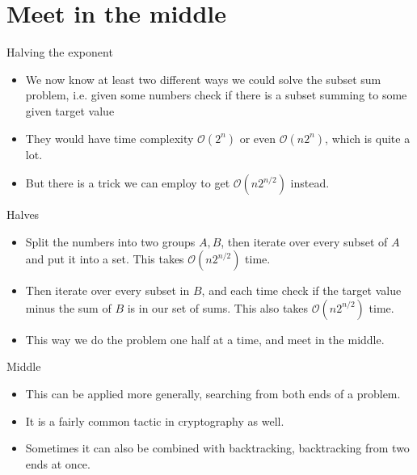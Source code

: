 \documentclass{beamer}
\begin{document}
\section*{Meet in the middle}

\begin{frame}{Halving the exponent}
    \begin{itemize}
        \item We now know at least two different ways we could solve the subset sum problem, i.e. given some numbers check if there is a subset summing to some given target value
        \item They would have time complexity $\mathcal{O}(2^n)$ or even $\mathcal{O}(n2^n)$, which is quite a lot.
        \item But there is a trick we can employ to get $\mathcal{O}(n2^{n/2})$ instead.
    \end{itemize}
\end{frame}

\begin{frame}{Halves}
    \begin{itemize}
        \item Split the numbers into two groups $A, B$, then iterate over every subset of $A$ and put it into a set. This takes $\mathcal{O}(n2^{n/2})$ time.
        \item Then iterate over every subset in $B$, and each time check if the target value minus the sum of $B$ is in our set of sums. This also takes $\mathcal{O}(n2^{n/2})$ time.
        \item This way we do the problem one half at a time, and meet in the middle.
    \end{itemize}
\end{frame}

\begin{frame}{Middle}
    \begin{itemize}
        \item This can be applied more generally, searching from both ends of a problem.
        \item It is a fairly common tactic in cryptography as well.
        \item Sometimes it can also be combined with backtracking, backtracking from two ends at once.
    \end{itemize}
\end{frame}
\end{document}
